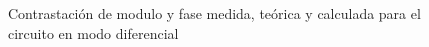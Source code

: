 \begin{figure}[H]
    \centering
{}
\caption{Contrastaci\'on de modulo y fase medida, te\'orica y calculada para el circuito en modo diferencial}
\label{fig:RES_DIF}
\end{figure}


